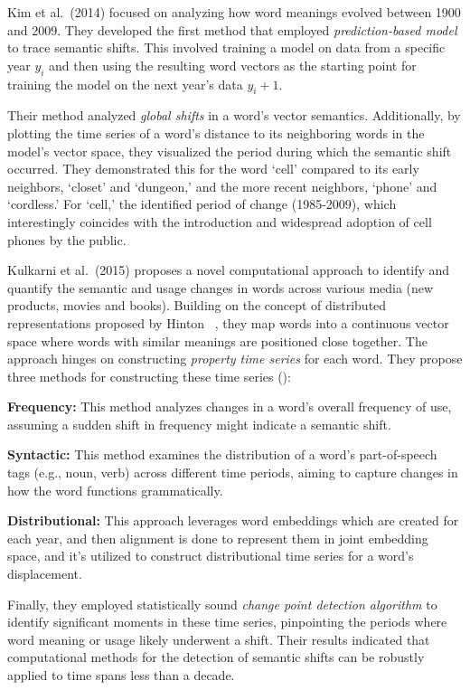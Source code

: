 Kim et al.\ (2014) focused on analyzing how word meanings evolved between 1900 and 2009.
They developed the first method that employed \emph{prediction-based model} to trace semantic shifts.
This involved training a model on data from a specific year $y_i$ and then using the resulting word vectors as the starting point for training the model on the next year's data $y_i+1$.

Their method analyzed \emph{global shifts} in a word's vector semantics.
Additionally, by plotting the time series of a word's distance to its neighboring words in the model's vector space, they visualized the period during which the semantic shift occurred.
They demonstrated this for the word `cell' compared to its early neighbors, `closet' and `dungeon,' and the more recent neighbors, `phone' and `cordless.'
For `cell,' the identified period of change (1985-2009), which interestingly coincides with the introduction and widespread adoption of cell phones by the public.

Kulkarni et al.\ (2015) proposes a novel computational approach to identify and quantify the semantic and usage changes in words across various media (new products, movies and books).
Building on the concept of distributed representations proposed by Hinton ~\cite{hinton1986learning}, they map words into a continuous vector space where words with similar meanings are positioned close together.
The approach hinges on constructing \emph{property time series} for each word.
They propose three methods for constructing these time series ():
\begin{packed_enumerate}
    \item \textbf{Frequency:}
    This method analyzes changes in a word's overall frequency of use, assuming a sudden shift in frequency might indicate a semantic shift.
    \item \textbf{Syntactic:}
    This method examines the distribution of a word's part-of-speech tags (e.g., noun, verb) across different time periods, aiming to capture changes in how the word functions grammatically.
    \item \textbf{Distributional:}
    This approach leverages word embeddings which are created for each year, and then alignment is done to represent them in joint embedding space,
    and it's utilized to construct distributional time series for a word's displacement.
\end{packed_enumerate}
Finally, they employed statistically sound \emph{change point detection algorithm} to identify significant moments in these time series, pinpointing the periods where word meaning or usage likely underwent a shift.
Their results indicated that computational methods for the detection of semantic shifts can be robustly applied to time spans less than a decade.

